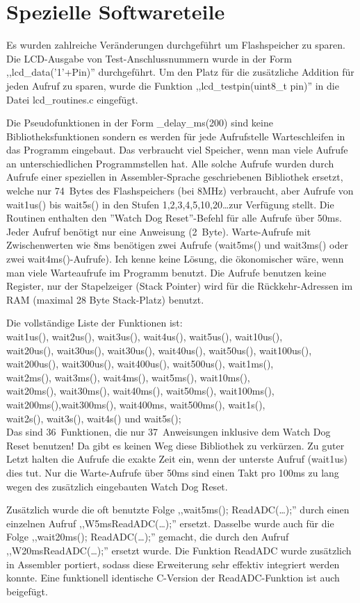 
\chapter{Spezielle Softwareteile}

Es wurden zahlreiche Veränderungen durchgeführt um Flashspeicher zu sparen.
Die LCD-Ausgabe von Test-Anschlussnummern wurde in der Form ,,lcd\_data('1'+Pin)'' durchgeführt.
Um den Platz für die zusätzliche Addition für jeden Aufruf zu sparen, wurde die
Funktion ,,lcd\_testpin(uint8\_t pin)'' in die Datei lcd\_routines.c eingefügt.


Die Pseudofunktionen in der Form \_delay\_ms(200) sind keine Bibliotheksfunktionen
sondern es werden für jede Aufrufstelle Warteschleifen in das Programm eingebaut.
Das verbraucht viel Speicher, wenn man viele Aufrufe an unterschiedlichen Programmstellen hat.
Alle solche Aufrufe wurden durch Aufrufe einer speziellen in Assembler-Sprache geschriebenen
Bibliothek ersetzt, welche nur 74~Bytes des Flashspeichers (bei 8MHz) verbraucht, aber
Aufrufe von wait1us() bis wait5s() in den Stufen 1,2,3,4,5,10,20\dots zur Verfügung stellt.
Die Routinen enthalten den ''Watch Dog Reset''-Befehl für alle Aufrufe über 50ms.
Jeder Aufruf benötigt nur eine Anweisung (2~Byte). Warte-Aufrufe mit Zwischenwerten
wie 8ms benötigen zwei Aufrufe (wait5ms() und wait3ms() oder zwei wait4ms()-Aufrufe).
Ich kenne keine Lösung, die ökonomischer wäre, wenn man viele Warteaufrufe im Programm benutzt.
Die Aufrufe benutzen keine Register, nur der Stapelzeiger (Stack Pointer) wird für die Rückkehr-Adressen
im RAM (maximal 28 Byte Stack-Platz) benutzt.

Die vollständige Liste der Funktionen ist:\\
wait1us(), wait2us(), wait3us(), wait4us(), wait5us(), wait10us(), \\
wait20us(), wait30us(), wait30us(), wait40us(), wait50us(), wait100us(), \\
wait200us(), wait300us(), wait400us(), wait500us(), wait1ms(),\\
wait2ms(), wait3ms(), wait4ms(), wait5ms(), wait10ms(),\\
wait20ms(), wait30ms(), wait40ms(), wait50ms(), wait100ms(),\\
wait200ms(),wait300ms(), wait400ms, wait500ms(), wait1s(),\\
wait2s(), wait3s(), wait4s() und wait5s();\\
Das sind 36~Funktionen, die nur 37~Anweisungen inklusive dem Watch Dog Reset benutzen!
Da gibt es keinen Weg diese Bibliothek zu verkürzen.
Zu guter Letzt halten die Aufrufe die exakte Zeit ein, wenn der unterste Aufruf (wait1us) dies tut.
Nur die Warte-Aufrufe über 50ms sind einen Takt pro 100ms zu lang wegen des zusätzlich eingebauten
Watch Dog Reset.


Zusätzlich wurde die oft benutzte Folge ,,wait5ms(); ReadADC(\dots);'' durch einen einzelnen Aufruf
,,W5msReadADC(\dots);'' ersetzt.
Dasselbe wurde auch für die Folge ,,wait20ms(); ReadADC(\dots);'' gemacht, die durch den Aufruf
,,W20msReadADC(\dots);'' ersetzt wurde.
Die Funktion ReadADC wurde zusätzlich in Assembler portiert, sodass diese Erweiterung
sehr effektiv integriert werden konnte.
Eine funktionell identische C-Version der ReadADC-Funktion ist auch beigefügt.
